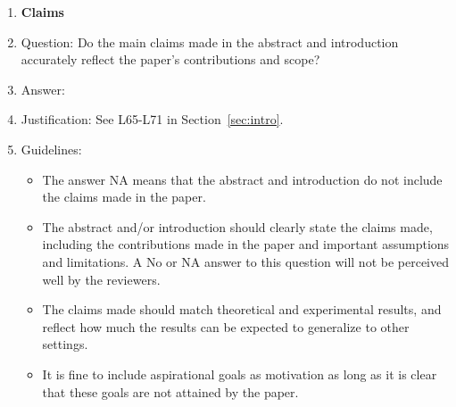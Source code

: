 \documentclass{article}
\begin{document}
\begin{enumerate}

\item {\bf Claims}
    \item[] Question: Do the main claims made in the abstract and introduction accurately reflect the paper's contributions and scope?
    \item[] Answer: \answerYes{} %
    \item[] Justification: See L65-L71 in Section~\ref{sec:intro}.
    \item[] Guidelines:
    \begin{itemize}
        \item The answer NA means that the abstract and introduction do not include the claims made in the paper.
        \item The abstract and/or introduction should clearly state the claims made, including the contributions made in the paper and important assumptions and limitations. A No or NA answer to this question will not be perceived well by the reviewers. 
        \item The claims made should match theoretical and experimental results, and reflect how much the results can be expected to generalize to other settings. 
        \item It is fine to include aspirational goals as motivation as long as it is clear that these goals are not attained by the paper. 
    \end{itemize}


\end{enumerate}
\end{document}

